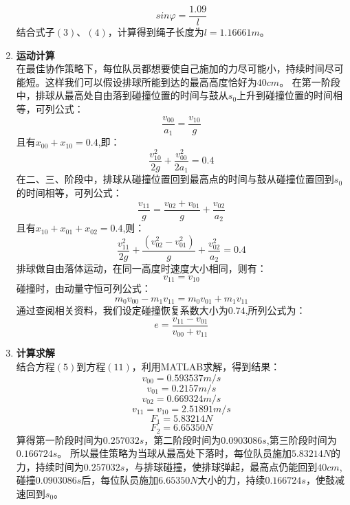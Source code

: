 \documentclass{cumcm}
\begin{document}
\begin{enumerate}
\begin{equation}
sin\varphi=\frac{1.09}{l}
\end{equation}
结合式子$(3)$、$(4)$，计算得到绳子长度为$l=1.16661m$。
\item \textbf{运动计算}\\
在最佳协作策略下，每位队员都想要使自己施加的力尽可能小，持续时间尽可能短。这样我们可以假设排球所能到达的最高高度恰好为$40cm$。
在第一阶段中，排球从最高处自由落到碰撞位置的时间与鼓从$s_0$上升到碰撞位置的时间相等，可列公式：
\begin{equation}
\frac{v_{00}}{a_1}=\frac{v_{10}}{g}
\end{equation}
且有$x_{00}+x_{10}=0.4$,即：
\begin{equation}
\frac{v^2_{10}}{2g}+\frac{v^2_{00}}{2a_1}=0.4
\end{equation}
在二、三、阶段中，排球从碰撞位置回到最高点的时间与鼓从碰撞位置回到$s_0$的时间相等，可列公式：
\begin{equation}
\frac{v_{11}}{g}=\frac{v_{02}+v_{01}}{g}+\frac{v_{02}}{a_2}
\end{equation}
且有$x_{10}+x_{01}+x_{02}=0.4$,则：
\begin{equation}
\frac{v^2_{11}}{2g}+\frac{(v^2_{02}-v^2_{01})}{g}+\frac{v^2_{02}}{a_2}=0.4
\end{equation}
排球做自由落体运动，在同一高度时速度大小相同，则有：
\begin{equation}
v_{11}=v_{10}
\end{equation}
碰撞时，由动量守恒可列公式：
\begin{equation}
m_0v_{00}-m_1v_{11}=m_0v_{01}+m_1v_{11}
\end{equation}
通过查阅相关资料，我们设定碰撞恢复系数大小为$0.74$,所列公式为：
\begin{equation}
e=\frac{v_{11}-v_{01}}{v_{00}+v_{11}}
\end{equation}


\item \textbf{计算求解}\\
结合方程$(5)$到方程$(11)$，利用MATLAB求解，得到结果：
$$v_{00}=0.593537m/s$$
$$v_{01}=0.2157m/s$$
$$v_{02}=0.669324m/s$$
$$v_{11}=v_{10}=2.51891m/s$$
$$F_1=5.83214N$$ 
$$F_2=6.65350N$$
\quad \quad
算得第一阶段时间为$0.257032s$，第二阶段时间为$0.0903086s$,第三阶段时间为$0.166724s$。
所以最佳策略为当球从最高处下落时，每位队员施加$5.83214N$的力，持续时间为$0.257032s$，与排球碰撞，使排球弹起，最高点仍能回到$40cm$,碰撞$0.0903086s$后，每位队员施加$6.65350N$大小的力，持续$0.166724s$，使鼓减速回到$s_0$。

\end{enumerate}
\end{document}
